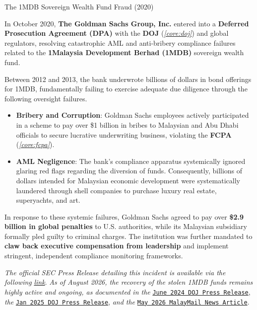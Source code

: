 \documentclass[10pt]{article}
\begin{document}
    \begin{core}[label=core:1mdb_scandal]{The 1MDB Sovereign Wealth Fund Fraud (2020)}

      In October 2020, \textbf{The Goldman Sachs Group, Inc.} entered into a \textbf{Deferred Prosecution Agreement (DPA)} with the \textbf{DOJ} (\textit{\autoref{core:doj}}) and global regulators, resolving catastrophic AML and anti-bribery compliance failures related to the \textbf{1Malaysia Development Berhad (1MDB)} sovereign wealth fund.

      Between 2012 and 2013, the bank underwrote billions of dollars in bond offerings for 1MDB, fundamentally failing to exercise adequate due diligence through the following oversight failures.

      \begin{itemize}

        \item \textbf{Bribery and Corruption}: Goldman Sachs employees actively participated in a scheme to pay over \$1 billion in bribes to Malaysian and Abu Dhabi officials to secure lucrative underwriting business, violating the \textbf{FCPA} (\textit{\autoref{core:fcpa}}).

        \item \textbf{AML Negligence}: The bank's compliance apparatus systemically ignored glaring red flags regarding the diversion of funds. Consequently, billions of dollars intended for Malaysian economic development were systematically laundered through shell companies to purchase luxury real estate, superyachts, and art.

      \end{itemize}

      In response to these systemic failures, Goldman Sachs agreed to pay over \textbf{\$2.9 billion in global penalties} to U.S. authorities, while its Malaysian subsidiary formally pled guilty to criminal charges. The institution was further mandated to \textbf{claw back executive compensation from leadership} and implement stringent, independent compliance monitoring frameworks.

      \textit{The official SEC Press Release detailing this incident is available via the following} \href{https://www.sec.gov/newsroom/press-releases/2020-265}{\textit{link}}. \textit{As of August 2026, the recovery of the stolen 1MDB funds remains highly active and ongoing, as documented in the} \href{https://www.justice.gov/archives/opa/pr/justice-department-repatriates-14b-misappropriated-1mdb-funds-malaysia}{\texttt{June 2024 DOJ Press Release}}, \textit{the} \href{https://www.justice.gov/archives/opa/pr/justice-department-recovers-additional-20m-misappropriated-1mdb-funds}{\texttt{Jan 2025 DOJ Press Release}}, \textit{and the} \href{https://www.malaymail.com/news/malaysia/2026/05/06/malaysias-1mdb-recovery-hits-rm313b-as-of-2025-ranks-among-worlds-highest-says-macc-chief/218902#:~:text=38%20million%20was%20recovered%20in%202022%2C%20RM8.,RM715.%2095%20million%20in%202024%20and%20RM1.}{\texttt{May 2026 MalayMail News Article}}.

    \end{core}
\end{document}
